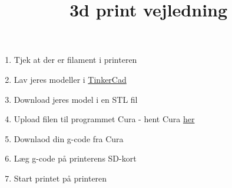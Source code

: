 \documentclass{article}
\title{3d print vejledning}
\begin{document}
	\maketitle
	\begin{enumerate}
		\item Tjek at der er filament i printeren 
		\item Lav jeres modeller i  \href{https://www.tinkercad.com/#/}{TinkerCad}
		\item Download jeres model i en STL fil
		\item Upload filen til programmet Cura - hent Cura \href{http://spidermaker.dk/download/}{her}
		\item Downlaod din g-code fra Cura
		\item Læg g-code på printerens SD-kort
		\item Start printet på printeren
	\end{enumerate}
\end{document}
